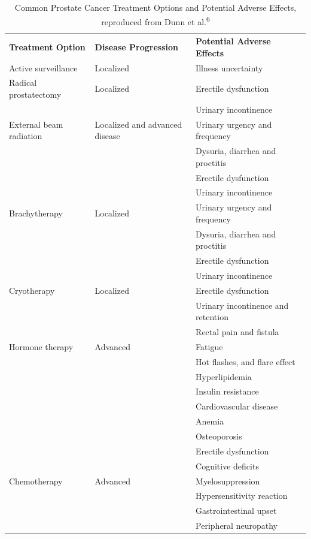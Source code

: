 \documentclass[
  12pt,
  a5,margin=2cmpaper,
]{article}
\begin{document}
\hypertarget{tab:adverse}{}
\begin{longtable}[]{@{}lll@{}}
\caption{Common Prostate Cancer Treatment Options and Potential Adverse
Effects, reproduced from Dunn et al.\textsuperscript{6}}\tabularnewline
\toprule\noalign{}
\endfirsthead
\endhead
\bottomrule\noalign{}
\endlastfoot
\textbf{Treatment Option} & \textbf{Disease Progression} &
\textbf{Potential Adverse Effects} \\
Active surveillance & Localized & Illness uncertainty \\
Radical prostatectomy & Localized & Erectile dysfunction \\
& & Urinary incontinence \\
External beam radiation & Localized and advanced disease & Urinary
urgency and frequency \\
& & Dysuria, diarrhea and proctitis \\
& & Erectile dysfunction \\
& & Urinary incontinence \\
Brachytherapy & Localized & Urinary urgency and frequency \\
& & Dysuria, diarrhea and proctitis \\
& & Erectile dysfunction \\
& & Urinary incontinence \\
Cryotherapy & Localized & Erectile dysfunction \\
& & Urinary incontinence and retention \\
& & Rectal pain and fistula \\
Hormone therapy & Advanced & Fatigue \\
& & Hot flashes, and flare effect \\
& & Hyperlipidemia \\
& & Insulin resistance \\
& & Cardiovascular disease \\
& & Anemia \\
& & Osteoporosis \\
& & Erectile dysfunction \\
& & Cognitive deficits \\
Chemotherapy & Advanced & Myelosuppression \\
& & Hypersensitivity reaction \\
& & Gastrointestinal upset \\
& & Peripheral neuropathy \\
\end{longtable}
\end{document}
